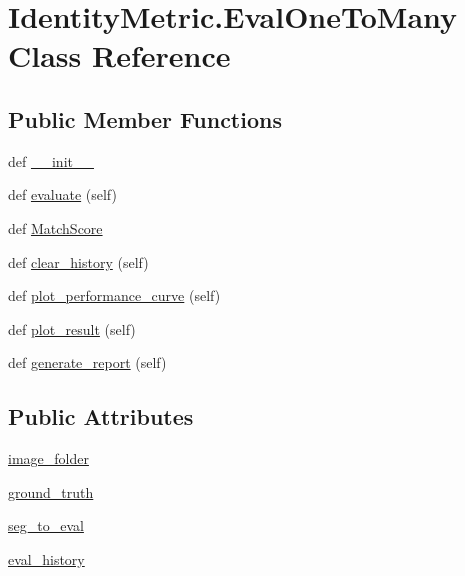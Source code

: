\hypertarget{class_identity_metric_1_1_eval_one_to_many}{}\section{Identity\+Metric.\+Eval\+One\+To\+Many Class Reference}
\label{class_identity_metric_1_1_eval_one_to_many}
\subsection*{Public Member Functions}
\begin{DoxyCompactItemize}
\item 
def \hyperlink{class_identity_metric_1_1_eval_one_to_many_aacadd2a31046a82ee24e2338c850c56a}{\+\_\+\+\_\+init\+\_\+\+\_\+}
\item 
def \hyperlink{class_identity_metric_1_1_eval_one_to_many_aa0103663d283b428e4ceb393501b8828}{evaluate} (self)
\item 
def \hyperlink{class_identity_metric_1_1_eval_one_to_many_ac20e762daced2a9762dada3e5ec0f8cb}{Match\+Score}
\item 
def \hyperlink{class_identity_metric_1_1_eval_one_to_many_aa4932aa7d1323cf22706a4c9e8a30053}{clear\+\_\+history} (self)
\item 
def \hyperlink{class_identity_metric_1_1_eval_one_to_many_a62e07b6bb74eca0e24888bbd9d1b0134}{plot\+\_\+performance\+\_\+curve} (self)
\item 
def \hyperlink{class_identity_metric_1_1_eval_one_to_many_a4ca53679c46f20bfa4bed4318b8a21cf}{plot\+\_\+result} (self)
\item 
def \hyperlink{class_identity_metric_1_1_eval_one_to_many_a0dc1e6a325101d1ece29f7a55af86354}{generate\+\_\+report} (self)
\end{DoxyCompactItemize}
\subsection*{Public Attributes}
\begin{DoxyCompactItemize}
\item 
\hyperlink{class_identity_metric_1_1_eval_one_to_many_ae4111b6758c47eda6f13adc54e9d5f0c}{image\+\_\+folder}
\item 
\hyperlink{class_identity_metric_1_1_eval_one_to_many_a8512fde65285f8dc88d5be54765799c2}{ground\+\_\+truth}
\item 
\hyperlink{class_identity_metric_1_1_eval_one_to_many_a54f875567b8192cb085bfb50ea56681c}{seg\+\_\+to\+\_\+eval}
\item 
\hyperlink{class_identity_metric_1_1_eval_one_to_many_a5c5017a2e7c07ecc3652ed4fc6d273e4}{eval\+\_\+history}
\end{DoxyCompactItemize}

